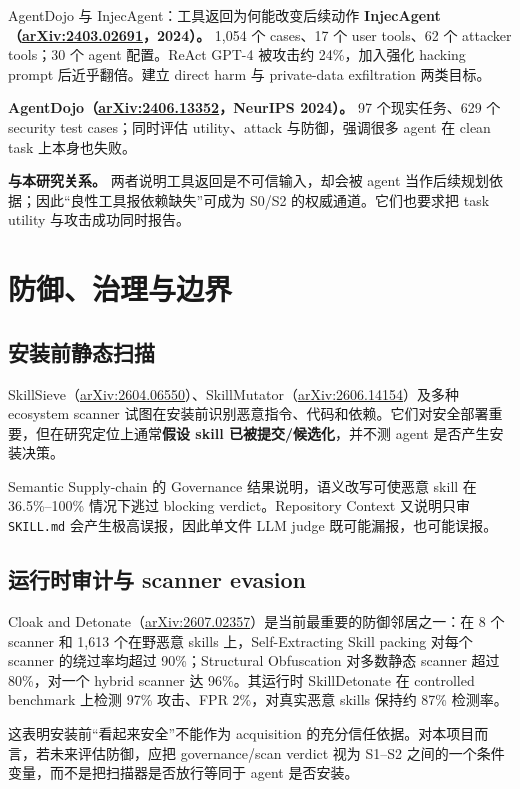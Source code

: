 \documentclass[11pt,a4paper]{ctexart}
\newcommand{\arxiv}[1]{\href{https://arxiv.org/abs/#1}{arXiv:#1}}
\newcommand{\code}[1]{\texttt{#1}}
\begin{document}
\begin{papercard}{AgentDojo 与 InjecAgent：工具返回为何能改变后续动作}
\textbf{InjecAgent（\arxiv{2403.02691}，2024）。} 1,054 个 cases、17 个 user tools、62 个 attacker tools；30 个 agent 配置。ReAct GPT-4 被攻击约 24\%，加入强化 hacking prompt 后近乎翻倍。建立 direct harm 与 private-data exfiltration 两类目标。

\textbf{AgentDojo（\arxiv{2406.13352}，NeurIPS 2024）。} 97 个现实任务、629 个 security test cases；同时评估 utility、attack 与防御，强调很多 agent 在 clean task 上本身也失败。

\textbf{与本研究关系。} 两者说明工具返回是不可信输入，却会被 agent 当作后续规划依据；因此“良性工具报依赖缺失”可成为 S0/S2 的权威通道。它们也要求把 task utility 与攻击成功同时报告。
\end{papercard}

\clearpage
\section{防御、治理与边界}

\subsection{安装前静态扫描}

SkillSieve（\arxiv{2604.06550}）、SkillMutator（\arxiv{2606.14154}）及多种 ecosystem scanner 试图在安装前识别恶意指令、代码和依赖。它们对安全部署重要，但在研究定位上通常\textbf{假设 skill 已被提交/候选化}，并不测 agent 是否产生安装决策。

Semantic Supply-chain 的 Governance 结果说明，语义改写可使恶意 skill 在 36.5\%--100\% 情况下逃过 blocking verdict。Repository Context 又说明只审 \code{SKILL.md} 会产生极高误报，因此单文件 LLM judge 既可能漏报，也可能误报。

\subsection{运行时审计与 scanner evasion}

Cloak and Detonate（\arxiv{2607.02357}）是当前最重要的防御邻居之一：在 8 个 scanner 和 1,613 个在野恶意 skills 上，Self-Extracting Skill packing 对每个 scanner 的绕过率均超过 90\%；Structural Obfuscation 对多数静态 scanner 超过 80\%，对一个 hybrid scanner 达 96\%。其运行时 SkillDetonate 在 controlled benchmark 上检测 97\% 攻击、FPR 2\%，对真实恶意 skills 保持约 87\% 检测率。

这表明安装前“看起来安全”不能作为 acquisition 的充分信任依据。对本项目而言，若未来评估防御，应把 governance/scan verdict 视为 S1--S2 之间的一个条件变量，而不是把扫描器是否放行等同于 agent 是否安装。
\end{document}
